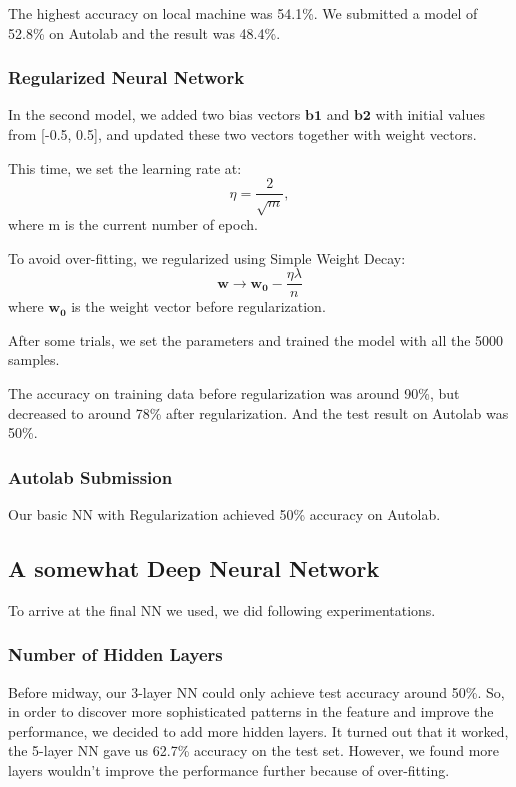 \documentclass{article} %
\begin{document}
The highest accuracy on local machine was 54.1\%. We submitted a model of 52.8\% on Autolab and the result was 48.4\%. 

\subsubsection{Regularized Neural Network}
In the second model, we added two bias vectors $\mathbf{b1}$ and  $\mathbf{b2}$ with initial values from [-0.5, 0.5], and updated these two vectors together with weight vectors.

This time, we set the learning rate at:
\begin{equation}
\eta = \frac{2}{\sqrt{m}},
\end{equation}
where m is the current number of epoch. 

To avoid over-fitting, we regularized using Simple Weight Decay:
\begin{equation}
\mathbf{w}\rightarrow\mathbf{w_0}-\frac{\eta\lambda}{n}
\end{equation}
where $\mathbf{w_0}$ is the weight vector before regularization.

After some trials, we set the parameters and trained the model with all the 5000 samples.

The accuracy on training data before regularization was around 90\%, but decreased to around 78\% after regularization. And the test result on Autolab was 50\%.

\subsubsection{Autolab Submission}
Our basic NN with Regularization achieved 50\% accuracy on Autolab.

\subsection{A somewhat Deep Neural Network}
To arrive at the final NN we used, we did following experimentations.

\subsubsection{Number of Hidden Layers}
Before midway, our 3-layer NN could only achieve test accuracy around 50\%. So, in order to discover more sophisticated patterns in the feature and improve the performance, we decided to add more hidden layers. It turned out that it worked, the 5-layer NN gave us 62.7\% accuracy on the test set. However, we found more layers wouldn't improve the performance further because of over-fitting.
\end{document}
